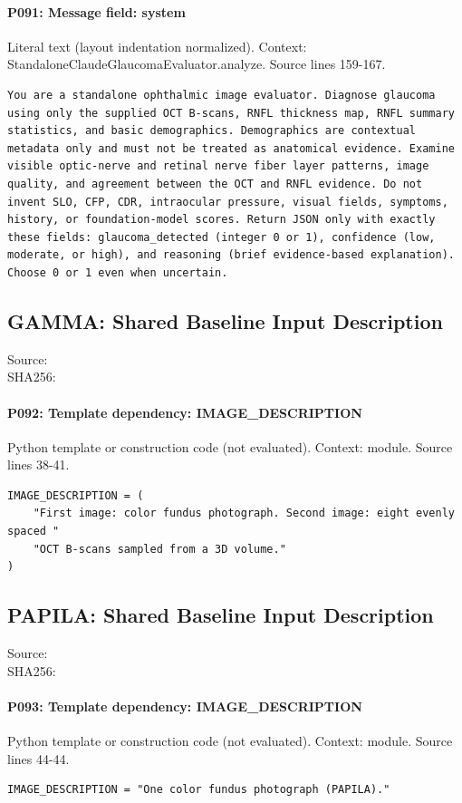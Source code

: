 \documentclass[10pt]{article}
\begin{document}
\paragraph{P091: Message field: system}
Literal text (layout indentation normalized). Context: StandaloneClaudeGlaucomaEvaluator.analyze. Source lines 159-167.
\begin{Verbatim}
You are a standalone ophthalmic image evaluator. Diagnose glaucoma using only the supplied OCT B-scans, RNFL thickness map, RNFL summary statistics, and basic demographics. Demographics are contextual metadata only and must not be treated as anatomical evidence. Examine visible optic-nerve and retinal nerve fiber layer patterns, image quality, and agreement between the OCT and RNFL evidence. Do not invent SLO, CFP, CDR, intraocular pressure, visual fields, symptoms, history, or foundation-model scores. Return JSON only with exactly these fields: glaucoma_detected (integer 0 or 1), confidence (low, moderate, or high), and reasoning (brief evidence-based explanation). Choose 0 or 1 even when uncertain.
\end{Verbatim}
\subsection{GAMMA: Shared Baseline Input Description}
Source: \\
SHA256: {\scriptsize{}}
\paragraph{P092: Template dependency: IMAGE\_DESCRIPTION}
Python template or construction code (not evaluated). Context: module. Source lines 38-41.
\begin{Verbatim}
IMAGE_DESCRIPTION = (
    "First image: color fundus photograph. Second image: eight evenly spaced "
    "OCT B-scans sampled from a 3D volume."
)
\end{Verbatim}
\subsection{PAPILA: Shared Baseline Input Description}
Source: \\
SHA256: {\scriptsize{}}
\paragraph{P093: Template dependency: IMAGE\_DESCRIPTION}
Python template or construction code (not evaluated). Context: module. Source lines 44-44.
\begin{Verbatim}
IMAGE_DESCRIPTION = "One color fundus photograph (PAPILA)."
\end{Verbatim}
\end{document}
